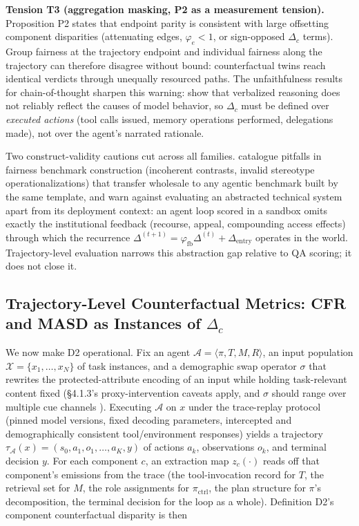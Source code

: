 \documentclass[acmsmall,nonacm]{acmart}
\begin{document}
\textbf{Tension T3 (aggregation masking, P2 as a measurement tension).} Proposition P2 states that endpoint parity is consistent with large offsetting component disparities (attenuating edges, $\varphi_e < 1$, or sign-opposed $\Delta_c$ terms). Group fairness at the trajectory endpoint and individual fairness along the trajectory can therefore disagree without bound: counterfactual twins reach identical verdicts through unequally resourced paths. The unfaithfulness results for chain-of-thought sharpen this warning: \cite{turpin2023language} show that verbalized reasoning does not reliably reflect the causes of model behavior, so $\Delta_c$ must be defined over \emph{executed actions} (tool calls issued, memory operations performed, delegations made), not over the agent's narrated rationale.

Two construct-validity cautions cut across all families. \cite{blodgett2021stereotyping} catalogue pitfalls in fairness benchmark construction (incoherent contrasts, invalid stereotype operationalizations) that transfer wholesale to any agentic benchmark built by the same template, and \cite{selbst2019fairness} warn against evaluating an abstracted technical system apart from its deployment context: an agent loop scored in a sandbox omits exactly the institutional feedback (recourse, appeal, compounding access effects) through which the recurrence $\Delta^{(t+1)} = \varphi_{\mathrm{fb}} \Delta^{(t)} + \Delta_{\mathrm{entry}}$ operates in the world. Trajectory-level evaluation narrows this abstraction gap relative to QA scoring; it does not close it.

\subsection{Trajectory-Level Counterfactual Metrics: CFR and MASD as Instances of $\Delta_c$}

We now make D2 operational. Fix an agent $\mathcal{A} = \langle \pi, T, M, R \rangle$, an input population $\mathcal{X} = \{x_1, \dots, x_N\}$ of task instances, and a demographic swap operator $\sigma$ that rewrites the protected-attribute encoding of an input while holding task-relevant content fixed (\S{}4.1.3's proxy-intervention caveats apply, and $\sigma$ should range over multiple cue channels \cite{tonneau2026different}). Executing $\mathcal{A}$ on $x$ under the trace-replay protocol (pinned model versions, fixed decoding parameters, intercepted and demographically consistent tool/environment responses) yields a trajectory $\tau_{\mathcal{A}}(x) = (s_0, a_1, o_1, \dots, a_K, y)$ of actions $a_k$, observations $o_k$, and terminal decision $y$. For each component $c$, an extraction map $z_c(\cdot)$ reads off that component's emissions from the trace (the tool-invocation record for $T$, the retrieval set for $M$, the role assignments for $\pi_{\mathrm{ctrl}}$, the plan structure for $\pi$'s decomposition, the terminal decision for the loop as a whole). Definition D2's component counterfactual disparity is then
\end{document}
